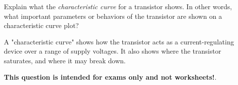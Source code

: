 

Explain what the {\it characteristic curve} for a transistor shows.  In other words, what important parameters or behaviors of the transistor are shown on a characteristic curve plot?







A "characteristic curve" shows how the transistor acts as a current-regulating device over a range of supply voltages.  It also shows where the transistor saturates, and where it may break down. 







{\bf This question is intended for exams only and not worksheets!}.



